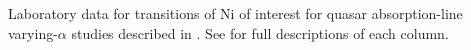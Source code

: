 Laboratory data for transitions of Ni of interest for quasar absorption-line varying-$\alpha$ studies described in . See  for full descriptions of each column.
